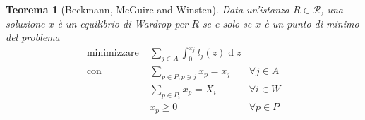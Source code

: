 \documentclass[a4paper]{article}
\newcounter{counter1}
\theoremstyle{plain}
\newtheorem{myteo}[counter1]{Teorema}
\theoremstyle{definition}
\theoremstyle{remark}
\DeclareMathOperator{\de}{d}
\begin{document}
\begin{myteo}[Beckmann, McGuire and Winsten]
  Data un'istanza $R\in \mathcal{R}$, una soluzione $x$ è un equilibrio di
  Wardrop per $R$ se e solo se $x$ è un punto di minimo del problema
  \begin{align*}
    \text{minimizzare} \;&  \sum _{j\in A} \int _0 ^ {x_j}
                           l_j(z)\de z \\
    \text{con} \;& \sum _{p\in P, p\ni j} x_p = x_j&\forall j\in
                                                     A\\
                         & \sum _{p\in P_i} x_p = X_i& \forall i\in W\\
                         & x_p \ge 0&\forall p\in P        
  \end{align*}
\end{myteo}
\end{document}
